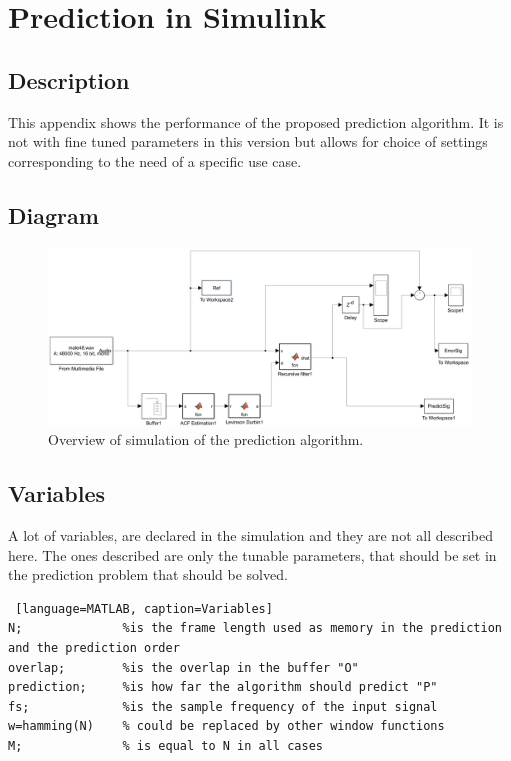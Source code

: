 
\section{Prediction in Simulink} \label{sec:predicSimulink}


\subsection{Description}
This appendix shows the performance of the proposed prediction algorithm. It is not with fine tuned parameters in this version but allows for choice of settings corresponding to the need of a specific use case.  


\subsection{Diagram}
\begin{figure} [h]
	\centering
	\includegraphics[width=\textwidth]{../Journal/Code/SimulinkPrediction}
	\caption{Overview of simulation of the prediction algorithm.}
	\label{Fig:PredictionSimulink}
\end{figure}


\subsection{Variables}
A lot of variables, are declared in the simulation and they are not all described here. The ones described are only the tunable parameters, that should be set in the prediction problem that should be solved. 
\begin{lstlisting} [language=MATLAB, caption=Variables]
N; 				%is the frame length used as memory in the prediction and the prediction order
overlap;		%is the overlap in the buffer "O"
prediction; 	%is how far the algorithm should predict "P"
fs; 			%is the sample frequency of the input signal 
w=hamming(N)	% could be replaced by other window functions
M;				% is equal to N in all cases
\end{lstlisting}

